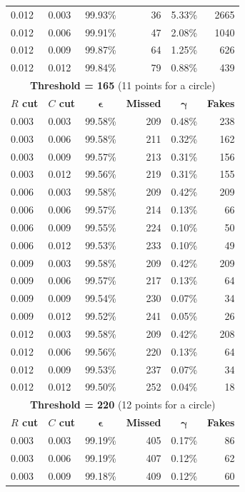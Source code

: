 \documentclass[11pt]{scrreprt}
\begin{document}
\begin{longtable}{llcrcr}
0.012 & 0.003 & 99.93\% & 36 & 5.33\% & 2665 \\
0.012 & 0.006 & 99.91\% & 47 & 2.08\% & 1040 \\
0.012 & 0.009 & 99.87\% & 64 & 1.25\% & 626 \\
0.012 & 0.012 & 99.84\% & 79 & 0.88\% & 439 \\
\bottomrule
\toprule
\multicolumn{6}{c}{\textbf{Threshold = 165} (11 points for a circle)}\\
\midrule
\textbf{$R$ cut} & \textbf{$C$ cut} & $\boldsymbol{\epsilon}$ & \textbf{Missed} & $\boldsymbol{\gamma}$ & \textbf{Fakes} \\
\midrule
0.003 & 0.003 & 99.58\% & 209 & 0.48\% & 238 \\
0.003 & 0.006 & 99.58\% & 211 & 0.32\% & 162 \\
0.003 & 0.009 & 99.57\% & 213 & 0.31\% & 156 \\
0.003 & 0.012 & 99.56\% & 219 & 0.31\% & 155 \\
0.006 & 0.003 & 99.58\% & 209 & 0.42\% & 209 \\
0.006 & 0.006 & 99.57\% & 214 & 0.13\% & 66 \\
0.006 & 0.009 & 99.55\% & 224 & 0.10\% & 50 \\
0.006 & 0.012 & 99.53\% & 233 & 0.10\% & 49 \\
0.009 & 0.003 & 99.58\% & 209 & 0.42\% & 209 \\
0.009 & 0.006 & 99.57\% & 217 & 0.13\% & 64 \\
0.009 & 0.009 & 99.54\% & 230 & 0.07\% & 34 \\
0.009 & 0.012 & 99.52\% & 241 & 0.05\% & 26 \\
0.012 & 0.003 & 99.58\% & 209 & 0.42\% & 208 \\
0.012 & 0.006 & 99.56\% & 220 & 0.13\% & 64 \\
0.012 & 0.009 & 99.53\% & 237 & 0.07\% & 34 \\
0.012 & 0.012 & 99.50\% & 252 & 0.04\% & 18 \\
\bottomrule
\toprule
\multicolumn{6}{c}{\textbf{Threshold = 220} (12 points for a circle)}\\
\midrule
\textbf{$R$ cut} & \textbf{$C$ cut} & $\boldsymbol{\epsilon}$ & \textbf{Missed} & $\boldsymbol{\gamma}$ & \textbf{Fakes} \\
\midrule
0.003 & 0.003 & 99.19\% & 405 & 0.17\% & 86 \\
0.003 & 0.006 & 99.19\% & 407 & 0.12\% & 62 \\
0.003 & 0.009 & 99.18\% & 409 & 0.12\% & 60 \\

\end{longtable}
\end{document}
